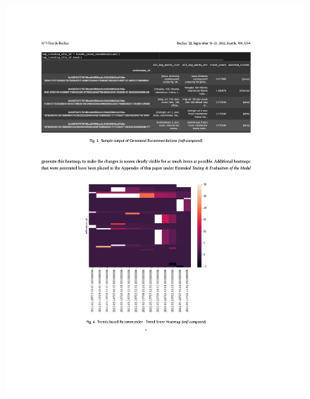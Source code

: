 \begin{figure}[h!]
\centering
\includegraphics[width=\textwidth]{images/appendix/papers/trends/Exploration of the possibility of infusing Social Media Trends into generating NFT Recommendations 7.jpeg}
\end{figure}

